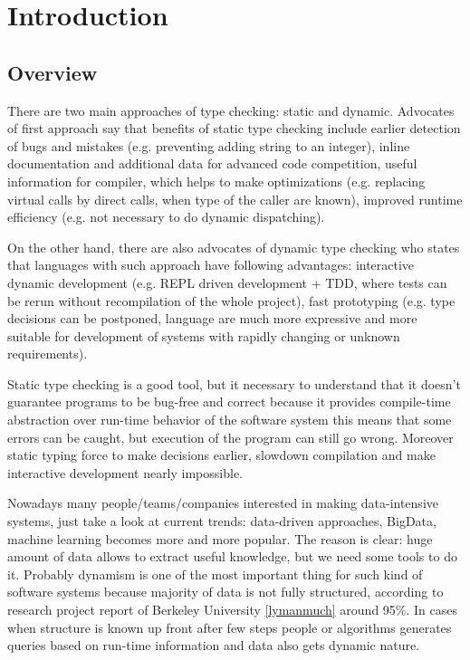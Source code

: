 \chapter{Introduction}
\label{chap:intro}

\section{Overview}

There are two main approaches of type checking: static and dynamic. Advocates of
first approach say that benefits of static type checking include earlier
detection of bugs and mistakes (e.g. preventing adding string to an integer),
inline documentation and additional data for advanced code competition, useful
information for compiler, which helps to make optimizations (e.g. replacing
virtual calls by direct calls, when type of the caller are known), improved
runtime efficiency (e.g. not necessary to do dynamic dispatching).

On the other hand, there are also advocates of dynamic type checking who states
that languages with such approach have following advantages: interactive dynamic
development (e.g. REPL driven development + TDD, where tests can be rerun
without recompilation of the whole project), fast prototyping (e.g. type
decisions can be postponed, language are much more expressive and more suitable
for development of systems with rapidly changing or unknown requirements).

Static type checking is a good tool, but it necessary to understand that it
doesn't guarantee programs to be bug-free and correct because it provides
compile-time abstraction over run-time behavior of the software system this
means that some errors can be caught, but execution of the program can still go
wrong. Moreover static typing force to make decisions earlier, slowdown
compilation and make interactive development nearly impossible.

Nowadays many people/teams/companies interested in making data-intensive
systems, just take a look at current trends: data-driven approaches, BigData,
machine learning becomes more and more popular. The reason is clear: huge amount
of data allows to extract useful knowledge, but we need some tools to do it.
Probably dynamism is one of the most important thing for such kind of software
systems because majority of data is not fully structured, according to research
project report of Berkeley University \ref{lymanmuch} around 95\%. In cases when
structure is known up front after few steps people or algorithms generates
queries based on run-time information and data also gets dynamic nature.

